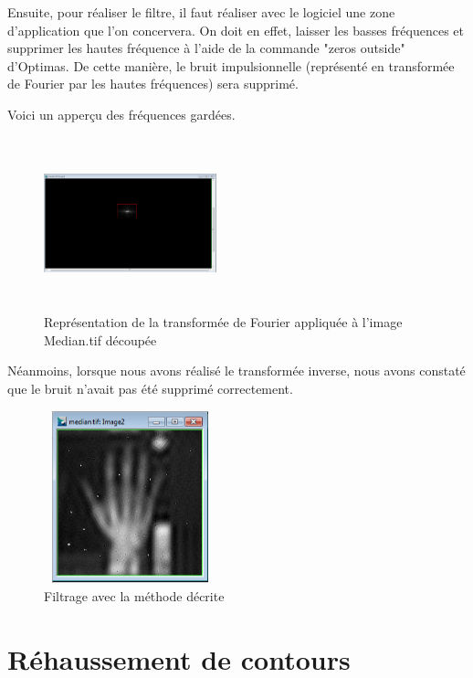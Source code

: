 \documentclass{scrreprt}
\begin{document}
Ensuite, pour réaliser le filtre, il faut réaliser avec le logiciel une zone d'application que l'on concervera. 
On doit en effet, laisser les basses fréquences et supprimer les hautes fréquence à l'aide de la commande "zeros outside" d'Optimas.
De cette manière, le bruit impulsionnelle (représenté en transformée de Fourier par les hautes fréquences) sera supprimé.

\newpage
Voici un apperçu des fréquences gardées. 

\begin{figure}[!h]
\centering
\includegraphics[height=5cm,width=5cm]{images/tfmediancut.png}
\caption{Représentation de la transformée de Fourier appliquée à l'image Median.tif découpée}
\end{figure}

Néanmoins, lorsque nous avons réalisé le transformée inverse, nous avons constaté que le bruit n'avait pas été supprimé correctement. 

\begin{figure}[!h]
\centering
\includegraphics[height=5cm,width=5cm]{images/mediancut.png}
\caption{Filtrage avec la méthode décrite}
\end{figure}

\newpage


\section{Réhaussement de contours}
\end{document}
